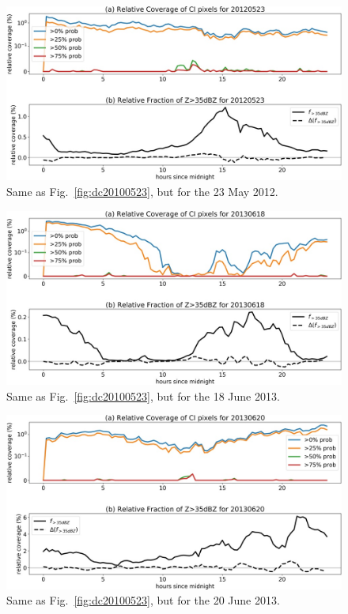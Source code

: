 \begin{figure}
\centering
\includegraphics[width=\textwidth]{Grafiken/Abbildungen/diurnal_cycle_20120523.jpg}
\caption{Same as Fig.~\ref{fig:dc20100523}, but for the 23 May 2012.}
\label{fig:dc20120523}
\end{figure}
\begin{figure}
\centering
\includegraphics[width=\textwidth]{Grafiken/Abbildungen/diurnal_cycle_20130618.jpg}
\caption{Same as Fig.~\ref{fig:dc20100523}, but for the 18 June 2013.}
\label{fig:dc20130618}
\end{figure}
\begin{figure}
\centering
\includegraphics[width=\textwidth]{Grafiken/Abbildungen/diurnal_cycle_20130620.jpg}
\caption{Same as Fig.~\ref{fig:dc20100523}, but for the 20 June 2013.}
\label{fig:dc20130620}
\end{figure}

